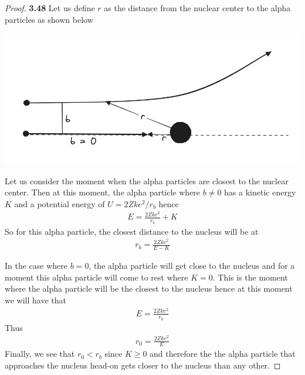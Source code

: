 \documentclass[11pt]{article}
\theoremstyle{definition}
\begin{document}
\cleardoublepage
\begin{proof}{\textbf{3.48}}
    Let us define $r$ as the distance from the nuclear center to the alpha
    particles as shown below 
    \begin{center}
        \includegraphics[scale=0.4]{ch3-48.png}
    \end{center}
    Let us consider the moment when the alpha particles are closest to the
    nuclear center. 
    Then at this moment, the alpha particle where $b \neq 0$ has a
    kinetic energy $K$ and a potential energy of $U = 2Zke^2/r_b$ hence
    \begin{align*}
        E = \frac{2Zke^2}{r_b} + K
    \end{align*}
    So for this alpha particle, the closest distance to the nucleus will be at
    \begin{align*}
        r_b = \frac{2Zke^2}{E - K}
    \end{align*}

    In the case where $b = 0$, the alpha particle will get close to the nucleus
    and for a moment this alpha particle will come to rest where $K = 0$.
    This is the moment where the alpha particle will be the closest to the 
    nucleus hence at this moment we will have that
    \begin{align*}
        E = \frac{2Zke^2}{r_0}
    \end{align*}
    Thus 
    \begin{align*}
        r_0 = \frac{2Zke^2}{E}
    \end{align*}
    Finally, we see that $r_0 < r_b$ since $K \geq 0$ and therefore the 
    the alpha particle that approaches the nucleus head-on gets closer to the
    nucleus than any other.
\end{proof}
\end{document}
